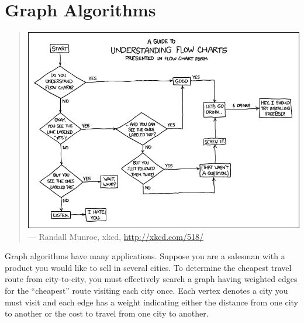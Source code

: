 
\chapter{Graph Algorithms}
\label{chap:graph_algorithms}

\begin{quote}
\footnotesize
{}
\includegraphics[scale=0.5]{image/graph-algorithms/flow-charts} \\
\noindent
--- Randall Munroe, xkcd,
\url{http://xkcd.com/518/}
\end{quote}

\noindent
Graph algorithms have many applications. Suppose you are a
salesman with a product you would
like to sell in several cities. To determine the cheapest travel route
from city-to-city, you must effectively search a graph having weighted
edges for the ``cheapest'' route visiting each city once. Each vertex
denotes a city you must visit and each edge has a weight indicating
either the distance from one city to another or the
cost to travel from one city to another.

